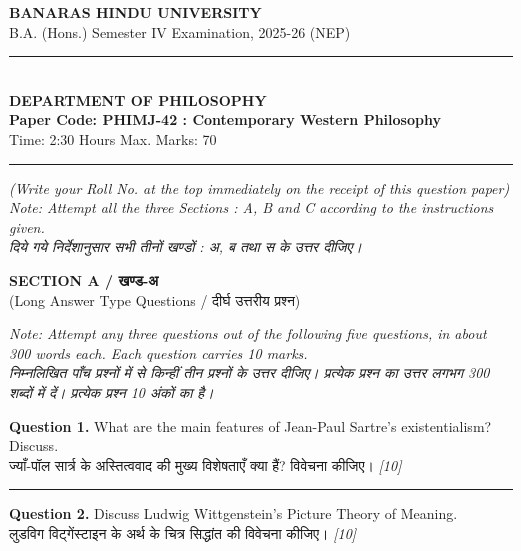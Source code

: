 \documentclass[11pt,a4paper]{article}
\newcommand{\pts}[1]{\hfill \textit{[#1]}}
\begin{document}
\begin{center}
  {\large\bfseries BANARAS HINDU UNIVERSITY}\\[2pt]
  {\normalsize B.A. (Hons.) Semester IV Examination, 2025-26 (NEP)}\\[6pt]
  \rule{0.8\linewidth}{0.5pt}\\[6pt]
  {\large\bfseries DEPARTMENT OF PHILOSOPHY}\\[4pt]
  {\large\bfseries Paper Code: PHIMJ-42 : Contemporary Western Philosophy}\\[4pt]
  {\normalsize Time: 2:30 Hours \hfill Max. Marks: 70}
\end{center}

\rule{\linewidth}{0.4pt}

\smallskip

\noindent \textit{(Write your Roll No. at the top immediately on the receipt of this question paper)}\\[2pt]
\noindent \textit{Note: Attempt all the three Sections : A, B and C according to the instructions given.}\\[1pt]
\noindent \textit{दिये गये निर्देशानुसार सभी तीनों खण्डों : अ, ब तथा स के उत्तर दीजिए।}

\bigskip

\begin{center}
  {\large\bfseries SECTION A / खण्ड-अ}\\[2pt]
  {\normalsize (Long Answer Type Questions / दीर्घ उत्तरीय प्रश्न)}
\end{center}

\noindent \textit{Note: Attempt any three questions out of the following five questions, in about 300 words each. Each question carries 10 marks.}\\[2pt]
\noindent \textit{निम्नलिखित पाँच प्रश्नों में से किन्हीं तीन प्रश्नों के उत्तर दीजिए। प्रत्येक प्रश्न का उत्तर लगभग 300 शब्दों में दें। प्रत्येक प्रश्न 10 अंकों का है।}

\bigskip

\noindent \textbf{Question 1.} What are the main features of Jean-Paul Sartre's existentialism? Discuss.\\[1pt]
ज्याँ-पॉल सार्त्र के अस्तित्ववाद की मुख्य विशेषताएँ क्या हैं? विवेचना कीजिए। \pts{10}

\medskip\rule{\linewidth}{0.2pt}\medskip

\noindent \textbf{Question 2.} Discuss Ludwig Wittgenstein's Picture Theory of Meaning.\\[1pt]
लुडविग विट्गेंस्टाइन के अर्थ के चित्र सिद्धांत की विवेचना कीजिए। \pts{10}
\end{document}
